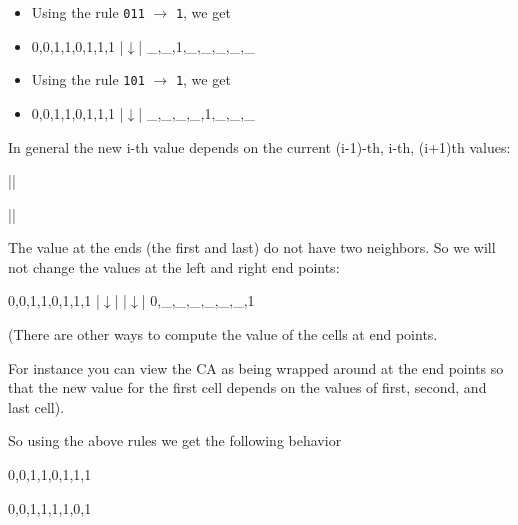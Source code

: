 \begin{itemize}
\item
  Using the rule \texttt{011} $\rightarrow$ \texttt{1}, we get
\item
\begin{consolethree}[escapeinside=||]
0,0,1,1,0,1,1,1
    |$\downarrow$|
_,_,1,_,_,_,_,_
\end{consolethree}
\end{itemize}


\begin{itemize}
\item
  Using the rule \texttt{101} $\rightarrow$ \texttt{1}, we get
\item
\begin{consolethree}[escapeinside=||]
0,0,1,1,0,1,1,1
        |$\downarrow$|
_,_,_,_,1,_,_,_
\end{consolethree}
\end{itemize}


In general the new i-th value depends on the current (i-1)-th, i-th, (i+1)th values:

\begin{consolethree}[escapeinside=||]
||



||
\end{consolethree}
The value at the ends (the first and last) do not have two neighbors. So we will not change the values at the left and right end points:

\begin{consolethree}[escapeinside=||]
0,0,1,1,0,1,1,1
|$\downarrow$|                 |$\downarrow$|
0,_,_,_,_,_,_,1
\end{consolethree}

(There are other ways to compute the value of the cells at end points.

For instance you can view the CA as being wrapped around at the end points so that the new value for the first cell depends on the values of first, second, and last cell).

So using the above rules we get the following behavior

\begin{console}
0,0,1,1,0,1,1,1

0,0,1,1,1,1,0,1
\end{console}

